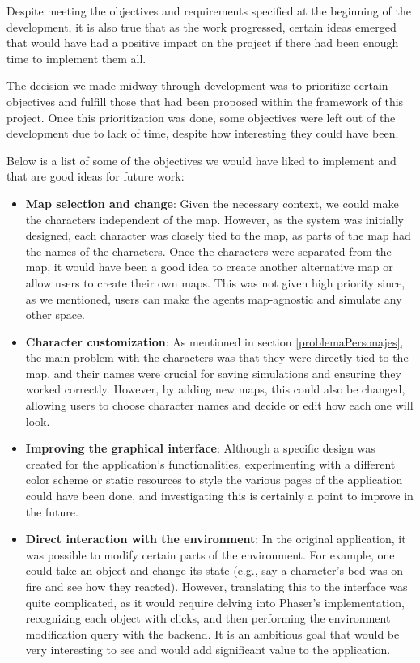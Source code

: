 Despite meeting the objectives and requirements specified at the beginning of the development, it is also true that as the work progressed, certain ideas emerged that would have had a positive impact on the project if there had been enough time to implement them all.

The decision we made midway through development was to prioritize certain objectives and fulfill those that had been proposed within the framework of this project. Once this prioritization was done, some objectives were left out of the development due to lack of time, despite how interesting they could have been.

Below is a list of some of the objectives we would have liked to implement and that are good ideas for future work:

\begin{itemize}
	\item \textbf{Map selection and change}: Given the necessary context, we could make the characters independent of the map. However, as the system was initially designed, each character was closely tied to the map, as parts of the map had the names of the characters. Once the characters were separated from the map, it would have been a good idea to create another alternative map or allow users to create their own maps. This was not given high priority since, as we mentioned, users can make the agents map-agnostic and simulate any other space.
	
	\item \textbf{Character customization}: As mentioned in section \ref{problemaPersonajes}, the main problem with the characters was that they were directly tied to the map, and their names were crucial for saving simulations and ensuring they worked correctly. However, by adding new maps, this could also be changed, allowing users to choose character names and decide or edit how each one will look.
	
	\item \textbf{Improving the graphical interface}: Although a specific design was created for the application's functionalities, experimenting with a different color scheme or static resources to style the various pages of the application could have been done, and investigating this is certainly a point to improve in the future.
	
	\item \textbf{Direct interaction with the environment}: In the original application, it was possible to modify certain parts of the environment. For example, one could take an object and change its state (e.g., say a character's bed was on fire and see how they reacted). However, translating this to the interface was quite complicated, as it would require delving into Phaser's implementation, recognizing each object with clicks, and then performing the environment modification query with the backend. It is an ambitious goal that would be very interesting to see and would add significant value to the application.
	

\end{itemize}
